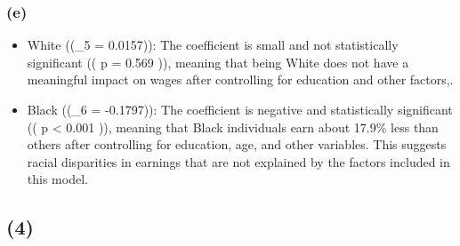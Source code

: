 \documentclass[
  letterpaper,
  DIV=11,
  numbers=noendperiod]{scrartcl}
\providecommand{\tightlist}{%
  \setlength{\itemsep}{0pt}\setlength{\parskip}{0pt}}\usepackage{longtable,booktabs,array}
\begin{document}
\subsubsection{(e)}\label{e}

\begin{itemize}
\tightlist
\item
  White ((\beta\_5 = 0.0157)): The coefficient is small and not
  statistically significant (( p = 0.569 )), meaning that being White
  does not have a meaningful impact on wages after controlling for
  education and other factors,.
\item
  Black ((\beta\_6 = -0.1797)): The coefficient is negative and
  statistically significant (( p \textless{} 0.001 )), meaning that
  Black individuals earn about 17.9\% less than others after controlling
  for education, age, and other variables. This suggests racial
  disparities in earnings that are not explained by the factors included
  in this model.
\end{itemize}

\subsection{(4)}\label{section-4}
\end{document}
